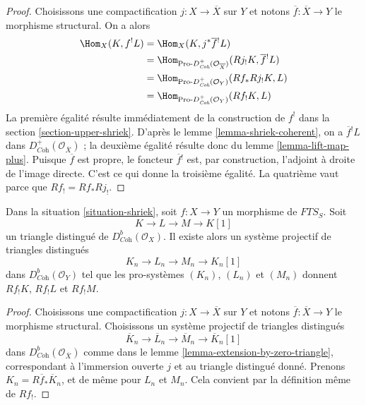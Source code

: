 \begin{proof}
Choisissons une compactification $j : X \to \overline{X}$ sur $Y$ et notons $\overline{f} : \overline{X} \to Y$ le morphisme structural. On a alors
\begin{align*}
\Hom_X(K, f^!L)
& =
\Hom_X(K, j^*\overline{f}{}^!L) \\
& =
\Hom_{\text{Pro-}D^+_{\textit{Coh}}(\mathcal{O}_{\overline{X}})}
(Rj_!K, \overline{f}{}^!L) \\
& =
\Hom_{\text{Pro-}D^+_{\textit{Coh}}(\mathcal{O}_Y)}(Rf_*Rj_!K, L) \\
& =
\Hom_{\text{Pro-}D^+_{\textit{Coh}}(\mathcal{O}_Y)}(Rf_!K, L)
\end{align*}
La première égalité résulte immédiatement de la construction de $f^!$ dans la section \ref{section-upper-shriek}. D'après le lemme \ref{lemma-shriek-coherent}, on a $\overline{f}{}^!L$ dans $D^+_{\textit{Coh}}(\mathcal{O}_{\overline{X}})$ ; la deuxième égalité résulte donc du lemme \ref{lemma-lift-map-plus}. Puisque $\overline{f}$ est propre, le foncteur $\overline{f}{}^!$ est, par construction, l'adjoint à droite de l'image directe. C'est ce qui donne la troisième égalité. La quatrième vaut parce que $Rf_! = Rf_* Rj_!$.
\end{proof}

\begin{lemma}
\label{lemma-compactly-supported-triangle}
Dans la situation \ref{situation-shriek}, soit $f : X \to Y$ un morphisme de $\textit{FTS}_S$. Soit
$$
K \to L \to M \to K[1]
$$
un triangle distingué de $D^b_{\textit{Coh}}(\mathcal{O}_X)$. Il existe alors un système projectif de triangles distingués
$$
K_n \to L_n \to M_n \to K_n[1]
$$
dans $D^b_{\textit{Coh}}(\mathcal{O}_Y)$ tel que les pro-systèmes $(K_n)$, $(L_n)$ et $(M_n)$ donnent $Rf_!K$, $Rf_!L$ et $Rf_!M$.
\end{lemma}

\begin{proof}
Choisissons une compactification $j : X \to \overline{X}$ sur $Y$ et notons $\overline{f} : \overline{X} \to Y$ le morphisme structural. Choisissons un système projectif de triangles distingués
$$
\overline{K}_n \to \overline{L}_n \to \overline{M}_n \to \overline{K}_n[1]
$$
dans $D^b_{\textit{Coh}}(\mathcal{O}_{\overline{X}})$ comme dans le lemme \ref{lemma-extension-by-zero-triangle}, correspondant à l'immersion ouverte $j$ et au triangle distingué donné. Prenons $K_n = R\overline{f}_*\overline{K}_n$, et de même pour $L_n$ et $M_n$. Cela convient par la définition même de $Rf_!$.
\end{proof}

